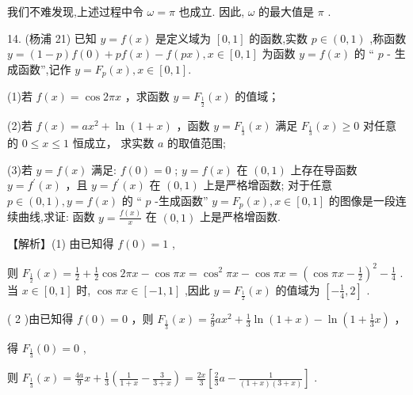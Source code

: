 \documentclass[10pt]{article}
\newcommand*\circled[1]{\tikz[baseline=(char.base)]{\node[shape=circle,draw,inner sep=1.5pt] (char) {\small #1};}}
\begin{document}
我们不难发现,上述过程中令 \(\omega  = \pi\) 也成立. 因此, \(\omega\) 的最大值是 \(\pi\) .

14. (杨浦 21) 已知 \(y = f\left( x\right)\) 是定义域为 \(\left\lbrack  {0,1}\right\rbrack\) 的函数,实数 \(p \in  \left( {0,1}\right)\) ,称函数 \(y = \left( {1 - p}\right) f\left( 0\right)  + {pf}\left( x\right)  - f\left( {px}\right) ,x \in  \left\lbrack  {0,1}\right\rbrack\) 为函数 \(y = f\left( x\right)\) 的 “ \(p\) - 生成函数”,记作 \(y = {F}_{p}\left( x\right) ,x \in  \left\lbrack  {0,1}\right\rbrack  .\)

(1)若 \(f\left( x\right)  = \cos {2\pi x}\) ，求函数 \(y = {F}_{\frac{1}{2}}\left( x\right)\) 的值域；

(2)若 \(f\left( x\right)  = a{x}^{2} + \ln \left( {1 + x}\right)\) ，函数 \(y = {F}_{\frac{1}{3}}\left( x\right)\) 满足 \({F}_{\frac{1}{3}}\left( x\right)  \geq  0\) 对任意的 \(0 \leq  x \leq  1\) 恒成立， 求实数 \(a\) 的取值范围;

(3)若 \(y = f\left( x\right)\) 满足: \circled{1}  \(f\left( 0\right)  = 0\) ;  \circled{2}  \(y = f\left( x\right)\) 在 \(\left( {0,1}\right)\) 上存在导函数 \(y = {f}^{\prime }\left( x\right)\) ，且 \(y = {f}^{\prime }\left( x\right)\) 在 \(\left( {0,1}\right)\) 上是严格增函数;  \circled{3} 对于任意 \(p \in  \left( {0,1}\right) ,y = f\left( x\right)\) 的 “ \(p\) -生成函数” \(y = {F}_{p}\left( x\right) ,x \in  \left\lbrack  {0,1}\right\rbrack\) 的图像是一段连续曲线,求证: 函数 \(y = \frac{f\left( x\right) }{x}\) 在 \(\left( {0,1}\right)\) 上是严格增函数.

【解析】(1) 由已知得 \(f\left( 0\right)  = 1\) ,

则 \({F}_{\frac{1}{2}}\left( x\right)  = \frac{1}{2} + \frac{1}{2}\cos {2\pi x} - \cos {\pi x} = {\cos }^{2}{\pi x} - \cos {\pi x} = {\left( \cos \pi x - \frac{1}{2}\right) }^{2} - \frac{1}{4}\) . 当 \(x \in  \left\lbrack  {0,1}\right\rbrack\) 时, \(\cos {\pi x} \in  \left\lbrack  {-1,1}\right\rbrack\) ,因此 \(y = {F}_{\frac{1}{2}}\left( x\right)\) 的值域为 \(\left\lbrack  {-\frac{1}{4},2}\right\rbrack\) .

( 2 )由已知得 \(f\left( 0\right)  = 0\) ，则 \({F}_{\frac{1}{3}}\left( x\right)  = \frac{2}{9}a{x}^{2} + \frac{1}{3}\ln \left( {1 + x}\right)  - \ln \left( {1 + \frac{1}{3}x}\right)\) ，

得 \({F}_{\frac{1}{3}}\left( 0\right)  = 0\) ,

则 \({F}_{\frac{1}{3}}\left( x\right)  = \frac{4a}{9}x + \frac{1}{3}\left( {\frac{1}{1 + x} - \frac{3}{3 + x}}\right)  = \frac{2x}{3}\left\lbrack  {\frac{2}{3}a - \frac{1}{\left( {1 + x}\right) \left( {3 + x}\right) }}\right\rbrack\) .
\end{document}
